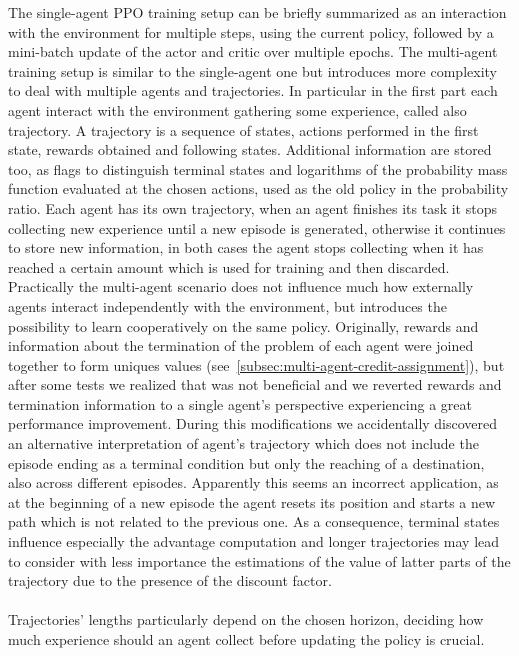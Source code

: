 \documentclass[11pt, a4paper, hidelinks]{report}
\begin{document}
The single-agent PPO training setup can be briefly summarized as an interaction with the environment for multiple steps, using the current policy, followed by a mini-batch update of the actor and critic over multiple epochs.
The multi-agent training setup is similar to the single-agent one but introduces more complexity to deal with multiple agents and trajectories.
In particular in the first part each agent interact with the environment gathering some experience, called also trajectory.
A trajectory is a sequence of states, actions performed in the first state, rewards obtained and following states.
Additional information are stored too, as flags to distinguish terminal states and logarithms of the probability mass function evaluated at the chosen actions, used as the old policy in the probability ratio.
Each agent has its own trajectory, when an agent finishes its task it stops collecting new experience until a new episode is generated, otherwise it continues to store new information, in both cases the agent stops collecting when it has reached a certain amount which is used for training and then discarded.
Practically the multi-agent scenario does not influence much how externally agents interact independently with the environment, but introduces the possibility to learn cooperatively on the same policy.
Originally, rewards and information about the termination of the problem of each agent were joined together to form uniques values (see~\ref{subsec:multi-agent-credit-assignment}), but after some tests we realized that was not beneficial and we reverted rewards and termination information to a single agent's perspective experiencing a great performance improvement.
During this modifications we accidentally discovered an alternative interpretation of agent's trajectory which does not include the episode ending as a terminal condition but only the reaching of a destination, also across different episodes.
Apparently this seems an incorrect application, as at the beginning of a new episode the agent resets its position and starts a new path which is not related to the previous one.
As a consequence, terminal states influence especially the advantage computation and longer trajectories may lead to consider with less importance the estimations of the value of latter parts of the trajectory due to the presence of the discount factor.
\\
\\
Trajectories' lengths particularly depend on the chosen horizon, deciding how much experience should an agent collect before updating the policy is crucial.
\end{document}
